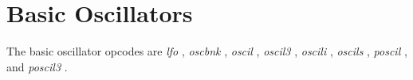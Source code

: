 \begin{comment}
\documentclass[10pt]{article}
\usepackage{fullpage, graphicx, url}
\setlength{\parskip}{1ex}
\setlength{\parindent}{0ex}
\title{Basic Oscillators}



\begin{tabular}{ccc}
The Alternative Csound Reference Manual & & \\
Previous &Signal Generators &Next

\end{tabular}

\end{comment}
\section{Basic Oscillators}


  The basic oscillator opcodes are \emph{lfo}
, \emph{oscbnk}
, \emph{oscil}
, \emph{oscil3}
, \emph{oscili}
, \emph{oscils}
, \emph{poscil}
, and \emph{poscil3}
. 


\begin{comment}
\begin{tabular}{lcr}
Previous &Home &Next \\
Signal Generators &Up &Dynamic Spectrum Oscillators

\end{tabular}



\end{comment}

